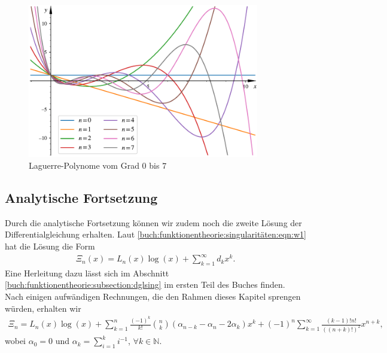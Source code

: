 \begin{figure}
\centering
\includegraphics[width=0.9\textwidth]{papers/laguerre/images/laguerre_poly.pdf}
\caption{Laguerre-Polynome vom Grad $0$ bis $7$}
\label{laguerre:fig:polyeval}
\end{figure}

\subsection{Analytische Fortsetzung}
Durch die analytische Fortsetzung können wir zudem noch die zweite Lösung der
Differentialgleichung erhalten.
Laut \eqref{buch:funktionentheorie:singularitäten:eqn:w1} hat die Lösung
die Form
\begin{align*}
\Xi_n(x)
=
L_n(x) \log(x) + \sum_{k=1}^\infty d_k x^k
.
\end{align*}
Eine Herleitung dazu lässt sich im
Abschnitt \ref{buch:funktionentheorie:subsection:dglsing} 
im ersten Teil des Buches finden.
Nach einigen aufwändigen Rechnungen, 
die den Rahmen dieses Kapitel sprengen würden,
erhalten wir
\begin{align*}
\Xi_n
=
L_n(x) \log(x)
+
\sum_{k=1}^n \frac{(-1)^k}{k!} \binom{n}{k}
(\alpha_{n-k} - \alpha_n - 2 \alpha_k)x^k
+
(-1)^n \sum_{k=1}^\infty \frac{(k-1)!n!}{((n+k)!)^2} x^{n+k},
\end{align*}
wobei $\alpha_0 = 0$ und $\alpha_k =\sum_{i=1}^k i^{-1}$,
$\forall k \in \mathbb{N}$.
